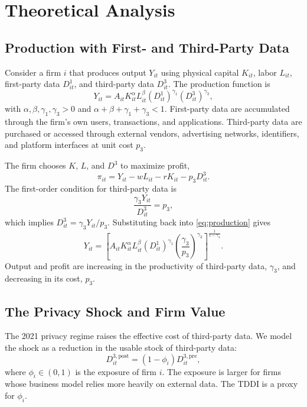 \section{Theoretical Analysis}
\label{sec:theory}

\subsection{Production with First- and Third-Party Data}

Consider a firm $i$ that produces output $Y_{it}$ using physical capital $K_{it}$, labor $L_{it}$, first-party data $D^{1}_{it}$, and third-party data $D^{3}_{it}$. The production function is
\begin{equation}
Y_{it}=A_{it}K_{it}^{\alpha}L_{it}^{\beta}\left(D^{1}_{it}\right)^{\gamma_1}\left(D^{3}_{it}\right)^{\gamma_3},
\label{eq:production}
\end{equation}
with $\alpha,\beta,\gamma_1,\gamma_3>0$ and $\alpha+\beta+\gamma_1+\gamma_3<1$. First-party data are accumulated through the firm's own users, transactions, and applications. Third-party data are purchased or accessed through external vendors, advertising networks, identifiers, and platform interfaces at unit cost $p_3$.

The firm chooses $K$, $L$, and $D^3$ to maximize profit,
\begin{equation}
\pi_{it}=Y_{it}-wL_{it}-rK_{it}-p_3D^{3}_{it}.
\label{eq:profit}
\end{equation}
The first-order condition for third-party data is
\begin{equation}
\frac{\gamma_3Y_{it}}{D^{3}_{it}}=p_3,
\label{eq:foc}
\end{equation}
which implies $D^{3}_{it}=\gamma_3Y_{it}/p_3$. Substituting back into \eqref{eq:production} gives
\begin{equation}
Y_{it}=\left[A_{it}K_{it}^{\alpha}L_{it}^{\beta}\left(D^{1}_{it}\right)^{\gamma_1}\left(\frac{\gamma_3}{p_3}\right)^{\gamma_3}\right]^{\frac{1}{1-\gamma_3}}.
\label{eq:reduced}
\end{equation}
Output and profit are increasing in the productivity of third-party data, $\gamma_3$, and decreasing in its cost, $p_3$.

\subsection{The Privacy Shock and Firm Value}

The 2021 privacy regime raises the effective cost of third-party data. We model the shock as a reduction in the usable stock of third-party data:
\begin{equation}
D^{3,\text{post}}_{it}=(1-\phi_i)D^{3,\text{pre}}_{it},
\label{eq:shock}
\end{equation}
where $\phi_i\in(0,1)$ is the exposure of firm $i$. The exposure is larger for firms whose business model relies more heavily on external data. The TDDI is a proxy for $\phi_i$.

